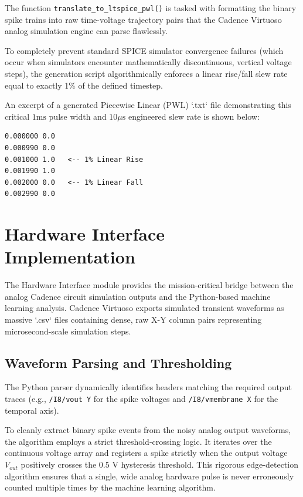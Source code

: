 The function \texttt{translate\_to\_ltspice\_pwl()} is tasked with formatting the binary spike trains into raw time-voltage trajectory pairs that the Cadence Virtuoso analog simulation engine can parse flawlessly. 

To completely prevent standard SPICE simulator convergence failures (which occur when simulators encounter mathematically discontinuous, vertical voltage steps), the generation script algorithmically enforces a linear rise/fall slew rate equal to exactly 1\% of the defined timestep.

An excerpt of a generated Piecewise Linear (PWL) `.txt` file demonstrating this critical $1\text{ms}$ pulse width and $10\mu\text{s}$ engineered slew rate is shown below:
\begin{verbatim}
0.000000 0.0
0.000990 0.0
0.001000 1.0   <-- 1% Linear Rise
0.001990 1.0
0.002000 0.0   <-- 1% Linear Fall
0.002990 0.0
\end{verbatim}

\section{Hardware Interface Implementation}

The Hardware Interface module provides the mission-critical bridge between the analog Cadence circuit simulation outputs and the Python-based machine learning analysis. Cadence Virtuoso exports simulated transient waveforms as massive `.csv` files containing dense, raw X-Y column pairs representing microsecond-scale simulation steps.

\subsection{Waveform Parsing and Thresholding}
The Python parser dynamically identifies headers matching the required output traces (e.g., \texttt{/I8/vout Y} for the spike voltages and \texttt{/I8/vmembrane X} for the temporal axis). 

To cleanly extract binary spike events from the noisy analog output waveforms, the algorithm employs a strict threshold-crossing logic. It iterates over the continuous voltage array and registers a spike strictly when the output voltage $V_{out}$ positively crosses the $0.5\text{ V}$ hysteresis threshold. This rigorous edge-detection algorithm ensures that a single, wide analog hardware pulse is never erroneously counted multiple times by the machine learning algorithm.

